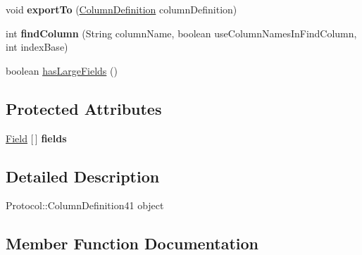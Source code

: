 \begin{DoxyCompactItemize}
\mbox{\label{classcom_1_1mysql_1_1cj_1_1result_1_1_default_column_definition_a9997f7a2813bccae2ad368156b7b3cbc}} 
void {\bfseries export\+To} (\mbox{\hyperlink{interfacecom_1_1mysql_1_1cj_1_1protocol_1_1_column_definition}{Column\+Definition}} column\+Definition)
\item 
\mbox{\label{classcom_1_1mysql_1_1cj_1_1result_1_1_default_column_definition_ae73bfdbb03fe73c3a9b7687e4e987500}} 
int {\bfseries find\+Column} (String column\+Name, boolean use\+Column\+Names\+In\+Find\+Column, int index\+Base)
\item 
boolean \mbox{\hyperlink{classcom_1_1mysql_1_1cj_1_1result_1_1_default_column_definition_a221996852cd52bf81bd9e3ecb8ab6ff5}{has\+Large\+Fields}} ()
\end{DoxyCompactItemize}
\subsection*{Protected Attributes}
\begin{DoxyCompactItemize}
\item 
\mbox{\label{classcom_1_1mysql_1_1cj_1_1result_1_1_default_column_definition_a3f4d762bd95f857062625fddb3a02102}} 
\mbox{\hyperlink{classcom_1_1mysql_1_1cj_1_1result_1_1_field}{Field}} \mbox{[}$\,$\mbox{]} {\bfseries fields}
\end{DoxyCompactItemize}


\subsection{Detailed Description}
Protocol\+::\+Column\+Definition41 object 

\subsection{Member Function Documentation}
\mbox{\label{classcom_1_1mysql_1_1cj_1_1result_1_1_default_column_definition_a765750a709687a3a53d1fe1fa9891c96}} 
